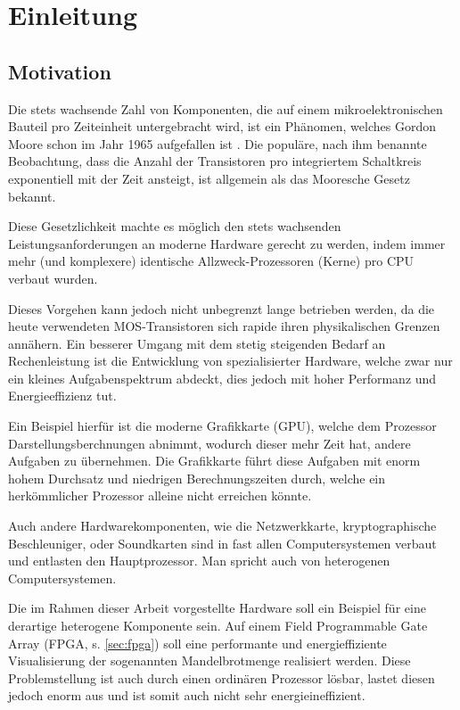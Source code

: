\documentclass[a4paper,12pt,onesided]{report}
\begin{document}
\newpage
\chapter{Einleitung}

\section{Motivation}
Die stets wachsende Zahl von Komponenten, die auf einem mikroelektronischen Bauteil pro Zeiteinheit untergebracht wird, ist ein Phänomen, welches Gordon Moore schon im Jahr 1965 aufgefallen ist \cite{moore1965cramming}. Die populäre, nach ihm benannte Beobachtung, dass die Anzahl der Transistoren pro integriertem Schaltkreis exponentiell mit der Zeit ansteigt, ist allgemein als das Mooresche Gesetz bekannt.

Diese Gesetzlichkeit machte es möglich den stets wachsenden Leistungsanforderungen an moderne Hardware gerecht zu werden, indem immer mehr (und komplexere) identische Allzweck-Prozessoren (Kerne) pro CPU verbaut wurden.

Dieses Vorgehen kann jedoch nicht unbegrenzt lange betrieben werden, da die heute verwendeten MOS-Transistoren sich rapide ihren physikalischen Grenzen annähern. Ein besserer Umgang mit dem stetig steigenden Bedarf an Rechenleistung ist die Entwicklung von spezialisierter Hardware, welche zwar nur ein kleines Aufgabenspektrum abdeckt, dies jedoch mit hoher Performanz und Energieeffizienz tut.

Ein Beispiel hierfür ist die moderne Grafikkarte (GPU), welche dem Prozessor Darstellungsberchnungen abnimmt, wodurch dieser mehr Zeit hat, andere Aufgaben zu übernehmen. Die Grafikkarte führt diese Aufgaben mit enorm hohem Durchsatz und niedrigen Berechnungszeiten durch, welche ein herkömmlicher Prozessor alleine nicht erreichen könnte.

Auch andere Hardwarekomponenten, wie die Netzwerkkarte, kryptographische Beschleuniger, oder Soundkarten sind in fast allen Computersystemen verbaut und entlasten den Hauptprozessor. Man spricht auch von heterogenen Computersystemen.

Die im Rahmen dieser Arbeit vorgestellte Hardware soll ein Beispiel für eine derartige heterogene Komponente sein. Auf einem Field Programmable Gate Array (FPGA, s. \autoref{sec:fpga}) soll eine performante und energieffiziente Visualisierung der sogenannten Mandelbrotmenge realisiert werden.
Diese Problemstellung ist auch durch einen ordinären Prozessor lösbar, lastet diesen jedoch enorm aus und ist somit auch nicht sehr energieineffizient. %
\end{document}
